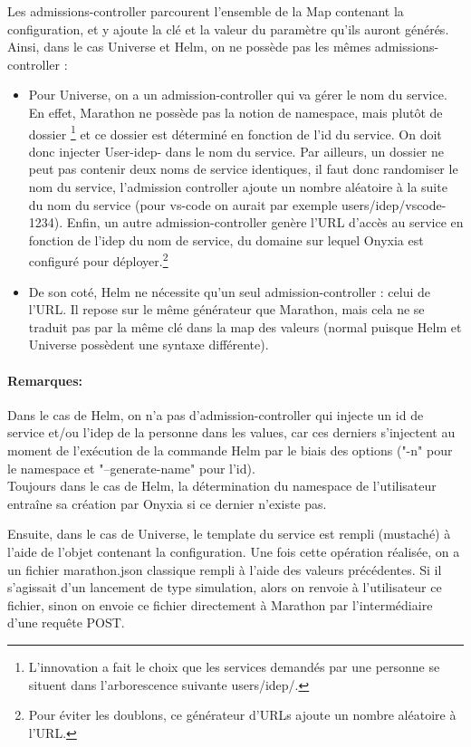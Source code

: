 \documentclass[11pt,fleqn]{book} %
\begin{document}
Les admissions-controller parcourent l'ensemble de la Map contenant la configuration, et y ajoute la clé et la valeur du paramètre qu'ils auront générés. Ainsi, dans le cas Universe et Helm, on ne possède pas les mêmes admissions-controller : \begin{itemize}
    \item Pour Universe, on a un admission-controller qui va gérer le nom du service. En effet, Marathon ne possède pas la notion de namespace, mais plutôt de dossier \footnote{L'innovation a fait le choix que les services demandés par une personne se situent dans l'arborescence suivante users/idep/.} et ce dossier est déterminé en fonction de l'id du service. On doit donc injecter User-idep- dans le nom du service. Par ailleurs, un dossier ne peut pas contenir deux noms de service identiques, il faut donc randomiser le nom du service, l'admission controller ajoute un nombre aléatoire à la suite du nom du service (pour vs-code on aurait par exemple users/idep/vscode-1234). Enfin, un autre admission-controller genère l'URL d'accès au service en fonction de l'idep du nom de service, du domaine sur lequel Onyxia est configuré pour déployer.\footnote{Pour éviter les doublons, ce générateur d'URLs ajoute un nombre aléatoire à l'URL.}
    \item De son coté, Helm ne nécessite qu'un seul admission-controller : celui de l'URL. Il repose sur le même générateur que Marathon, mais cela ne se traduit pas par la même clé dans la map des valeurs (normal puisque Helm et Universe possèdent une syntaxe différente).
\end{itemize}

\begin{interrupt}
\paragraph{Remarques:}
 Dans le cas de Helm, on n'a pas d'admission-controller qui injecte un id de service et/ou l'idep de la personne dans les values, car ces derniers s'injectent au moment de l'exécution de la commande Helm par le biais des options ("-n" pour le namespace et "--generate-name" pour l'id). \\
 Toujours dans le cas de Helm, la détermination du namespace de l'utilisateur entraîne sa création par Onyxia si ce dernier n'existe pas.
\end{interrupt}
Ensuite, dans le cas de Universe, le template du service est rempli (mustaché) à l'aide de l'objet contenant la configuration. Une fois cette opération réalisée, on a un fichier marathon.json classique rempli à l'aide des valeurs précédentes. Si il s'agissait d'un lancement de type simulation, alors on renvoie à l'utilisateur ce fichier, sinon on envoie ce fichier directement à Marathon par l'intermédiaire d'une requête POST.\\
\end{document}
